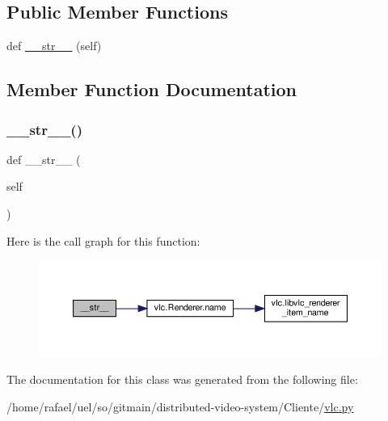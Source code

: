\subsection*{Public Member Functions}
\begin{DoxyCompactItemize}
\item 
def \hyperlink{classvlc_1_1_audio_output_device_a23e8041ce1015febe4fdace3225714f9}{\+\_\+\+\_\+str\+\_\+\+\_\+} (self)
\end{DoxyCompactItemize}


\subsection{Member Function Documentation}
\mbox{\label{classvlc_1_1_audio_output_device_a23e8041ce1015febe4fdace3225714f9}} 
\subsubsection{\texorpdfstring{\+\_\+\+\_\+str\+\_\+\+\_\+()}{\_\_str\_\_()}}
{\footnotesize\ttfamily def \+\_\+\+\_\+str\+\_\+\+\_\+ (\begin{DoxyParamCaption}\item[{}]{self }\end{DoxyParamCaption})}

Here is the call graph for this function\+:
\nopagebreak
\begin{figure}[H]
\begin{center}
\leavevmode
\includegraphics[width=350pt]{classvlc_1_1_audio_output_device_a23e8041ce1015febe4fdace3225714f9_cgraph}
\end{center}
\end{figure}


The documentation for this class was generated from the following file\+:\begin{DoxyCompactItemize}
\item 
/home/rafael/uel/so/gitmain/distributed-\/video-\/system/\+Cliente/\hyperlink{vlc_8py}{vlc.\+py}\end{DoxyCompactItemize}
